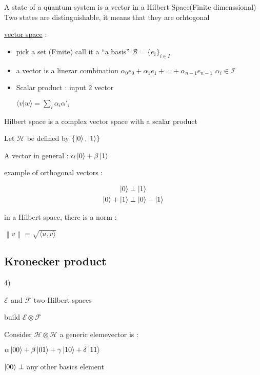 \documentclass{article}
\newcommand{\norm}[1]{\left\lVert#1\right\rVert}
\begin{document}
    A state of a quantum system is a vector in a Hilbert Space(Finite
    dimenssional) \\
    Two states are distinguishable, it means that they are orhtogonal

    \underline{vector space} :

      \begin{itemize}
        \item pick a set (Finite) call it a ``a basis''
          $\mathcal{B} = \{e_i\}_{i \in I}$

        \item a vector is a linerar combination
          $\alpha_0 e_0 + \alpha_1 e_1 + \ldots + \alpha_{n-1} e_{n-1}$ $\alpha_i \in
          \mathcal{I}$


        \item Scalar product : input 2 vector

          $\langle v|w \rangle = \sum_i \alpha_i \alpha'_i$
      \end{itemize} 

  Hilbert space is a complex vector space with a scalar product

  Let $\mathcal{H}$ be defined by $\{\ket{0}, \ket{1} \}$

  A vector in general : $\alpha \ket{0} + \beta \ket{1}$

  example of orthogonal vectors :

  \begin{align*}
    \ket{0} &\perp \ket{1} \\
    \ket{0} + \ket{1} &\perp \ket{0} - \ket{1}
  \end{align*}

  in a Hilbert space, there is a norm :

  $\norm{v} = \sqrt{\langle u , v \rangle}$

  \subsection{Kronecker product}

  4)

    $\mathcal{E}$ and $\mathcal{F}$ two Hilbert spaces

    build $\mathcal{E} \otimes \mathcal{F}$


    Consider $\mathcal{H} \otimes \mathcal{H}$ a generic elemevector is :

    $\alpha \ket{00} + \beta \ket{01} + \gamma \ket{10} + \delta \ket{11}$

    $\ket{00} \perp$ any other basics element
\end{document}
